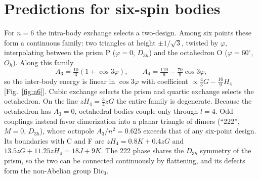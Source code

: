 \documentclass[pre,twocolumn,superscriptaddress,amsmath,amssymb,floatfix]{revtex4-2}
\begin{document}
\section{Predictions for six-spin bodies}\label{sec:n6}

For $n=6$ the intra-body exchange selects a two-design. Among six points these form a continuous family: two triangles at height $\pm1/\sqrt3$, twisted by $\varphi$, interpolating between the prism P ($\varphi=0$, $D_{3h}$) and the octahedron O ($\varphi=60^\circ$, $O_h$). Along this family
\begin{equation}
A_3=\tfrac{10}{3}(1+\cos3\varphi),\qquad A_4=\tfrac{119}{9}-\tfrac{70}{9}\cos3\varphi,
\end{equation}
so the inter-body energy is linear in $\cos3\varphi$ with coefficient $\propto\tfrac43G-\tfrac{16}{9}H_4$ [Fig.~\ref{fig:n6}]. Cubic exchange selects the prism and quartic exchange selects the octahedron. On the line $zH_4=\tfrac34zG$ the entire family is degenerate. Because the octahedron has $A_3=0$, octahedral bodies couple only through $l=4$. Odd couplings instead favor dimerization into a planar triangle of dimers (``222'', $M=0$, $D_{3h}$), whose octupole $A_3/n^2=0.625$ exceeds that of any six-point design. Its boundaries with C and F are $zH_4=0.8K+0.4zG$ and $13.5zG+11.25zH_4=18J+9K$. The 222 phase shares the $D_{3h}$ symmetry of the prism, so the two can be connected continuously by flattening, and its defects form the non-Abelian group $\mathrm{Dic}_3$.
\end{document}
